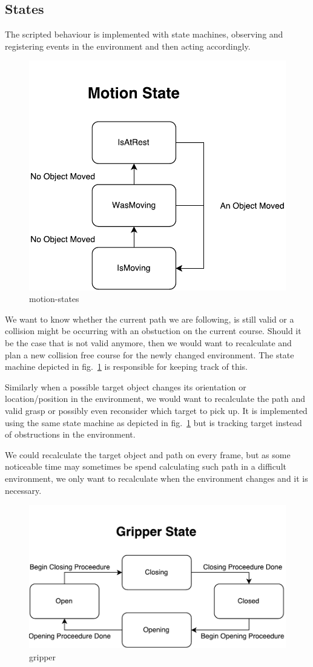 \subsection{States}\label{sec:states}

The scripted behaviour is implemented with state machines, observing and registering events in the environment and then acting accordingly.

\begin{figure}
\centering
\includegraphics[width=.4\linewidth]{figures/statediagrams/motion-states.pdf}
\caption{motion-states}
\label{fig:motion-states}
\end{figure}

We want to know whether the current path we are following, is still valid or a collision might be occurring with an obstuction on the current course. Should it be the case that is not valid anymore, then we would want to recalculate and plan a new collision free course for the newly changed environment. The state machine depicted in fig.~\ref{fig:motion-states} is responsible for keeping track of this.

Similarly when a possible target object changes its orientation or location/position in the environment, we would want to recalculate the path and valid grasp or possibly even reconsider which target to pick up. It is implemented using the same state machine as depicted in fig.~\ref{fig:motion-states} but is tracking target instead of obstructions in the environment.

We could recalculate the target object and path on every frame, but as some noticeable time may sometimes be spend calculating such path in a difficult environment, we only want to recalculate when the environment changes and it is necessary.

\begin{figure}
\centering
\includegraphics[width=.6\linewidth]{figures/statediagrams/gripper.pdf}
\caption{gripper}
\label{fig:gripper}
\end{figure}

